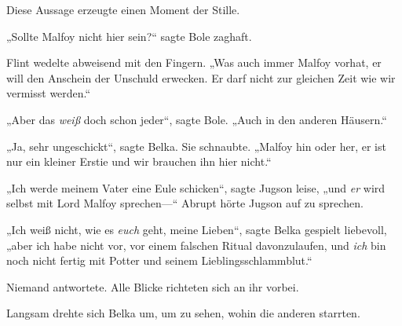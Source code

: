 Diese Aussage erzeugte einen Moment der Stille.

„Sollte Malfoy nicht hier sein?“ sagte Bole zaghaft.

Flint wedelte abweisend mit den Fingern. „Was auch immer Malfoy vorhat, er will den Anschein der Unschuld erwecken. Er darf nicht zur gleichen Zeit wie wir vermisst werden.“

„Aber das \emph{weiß} doch schon jeder“, sagte Bole. „Auch in den anderen Häusern.“

„Ja, sehr ungeschickt“, sagte Belka. Sie schnaubte. „Malfoy hin oder her, er ist nur ein kleiner Erstie und wir brauchen ihn hier nicht.“

„Ich werde meinem Vater eine Eule schicken“, sagte Jugson leise, „und \emph{er} wird selbst mit Lord Malfoy sprechen—“ Abrupt hörte Jugson auf zu sprechen.

„Ich weiß nicht, wie es \emph{euch} geht, meine Lieben“, sagte Belka gespielt liebevoll, „aber ich habe nicht vor, vor einem falschen Ritual davonzulaufen, und \emph{ich} bin noch nicht fertig mit Potter und seinem Lieblingsschlammblut.“

Niemand antwortete. Alle Blicke richteten sich an ihr vorbei.

Langsam drehte sich Belka um, um zu sehen, wohin die anderen starrten.

